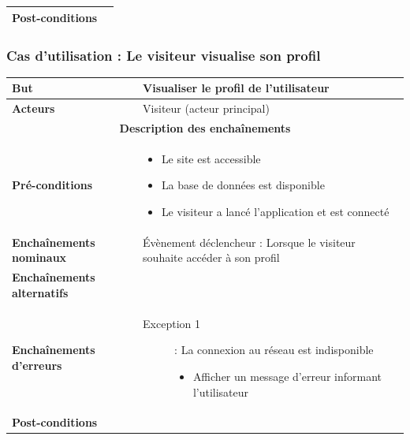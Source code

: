 \documentclass[a4paper,12pt]{report}
\begin{document}
\begin{onehalfspace}
\begin{tabular}{|p{3cm}|p{}|}
\textbf{Post-conditions} &
\\ \hline %

\end{tabular}


\subsubsection{Cas d'utilisation : Le visiteur visualise son profil}
\begin{tabular}{|p{3cm}|p{}|}
\hline %

\textbf{But} &
Visualiser le profil de l'utilisateur
\\ \hline %

\textbf{Acteurs} &
Visiteur (acteur principal)
\\ \hline %

\multicolumn{2}{|c|}{\textbf{Description des enchaînements}}
\\ \hline %

\textbf{Pré-conditions} &
    \begin{itemize}
      \item Le site est accessible
      \item La base de données est disponible
      \item Le visiteur a lancé l'application et est connecté
    \end{itemize}
\\ \hline %

\textbf{Enchaînements nominaux} &
  Évènement déclencheur : Lorsque le visiteur souhaite accéder à son profil
\\ \hline %

\textbf{Enchaînements alternatifs} &
\\ \hline %

\textbf{Enchaînements d'erreurs} &
  \begin{description}
    \item[Exception 1]: La connexion au réseau est indisponible
    \begin{itemize}
      \item Afficher un message d’erreur informant l'utilisateur
    \end{itemize}
  \end{description}
\\ \hline %

\textbf{Post-conditions} &
\\ \hline %

\end{tabular}


\end{onehalfspace}
\end{document}
